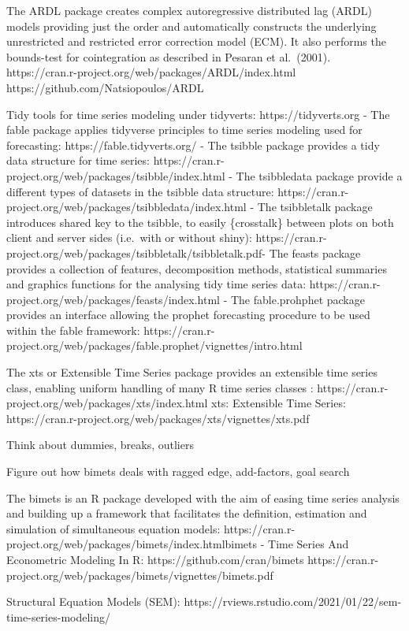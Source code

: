 \documentclass[
  letterpaper,
  DIV=11,
  numbers=noendperiod]{scrreport}
\begin{document}
The ARDL package creates complex autoregressive distributed lag (ARDL)
models providing just the order and automatically constructs the
underlying unrestricted and restricted error correction model (ECM). It
also performs the bounds-test for cointegration as described in Pesaran
et al.~(2001). https://cran.r-project.org/web/packages/ARDL/index.html
https://github.com/Natsiopoulos/ARDL

Tidy tools for time series modeling under tidyverts:
https://tidyverts.org - The fable package applies tidyverse principles
to time series modeling used for forecasting:
https://fable.tidyverts.org/ - The tsibble package provides a tidy data
structure for time series:
https://cran.r-project.org/web/packages/tsibble/index.html - The
tsibbledata package provide a different types of datasets in the tsibble
data structure:
https://cran.r-project.org/web/packages/tsibbledata/index.html - The
tsibbletalk package introduces shared key to the tsibble, to easily
\{crosstalk\} between plots on both client and server sides (i.e.~with
or without shiny):
https://cran.r-project.org/web/packages/tsibbletalk/tsibbletalk.pdf- The
feasts package provides a collection of features, decomposition methods,
statistical summaries and graphics functions for the analysing tidy time
series data: https://cran.r-project.org/web/packages/feasts/index.html -
The fable.prohphet package provides an interface allowing the prophet
forecasting procedure to be used within the fable framework:
https://cran.r-project.org/web/packages/fable.prophet/vignettes/intro.html

The xts or Extensible Time Series package provides an extensible time
series class, enabling uniform handling of many R time series classes :
https://cran.r-project.org/web/packages/xts/index.html xts: Extensible
Time Series:
https://cran.r-project.org/web/packages/xts/vignettes/xts.pdf

Think about dummies, breaks, outliers

Figure out how bimets deals with ragged edge, add-factors, goal search

The bimets is an R package developed with the aim of easing time series
analysis and building up a framework that facilitates the definition,
estimation and simulation of simultaneous equation models:
https://cran.r-project.org/web/packages/bimets/index.htmlbimets - Time
Series And Econometric Modeling In R: https://github.com/cran/bimets
https://cran.r-project.org/web/packages/bimets/vignettes/bimets.pdf

Structural Equation Models (SEM):
https://rviews.rstudio.com/2021/01/22/sem-time-series-modeling/
\end{document}
